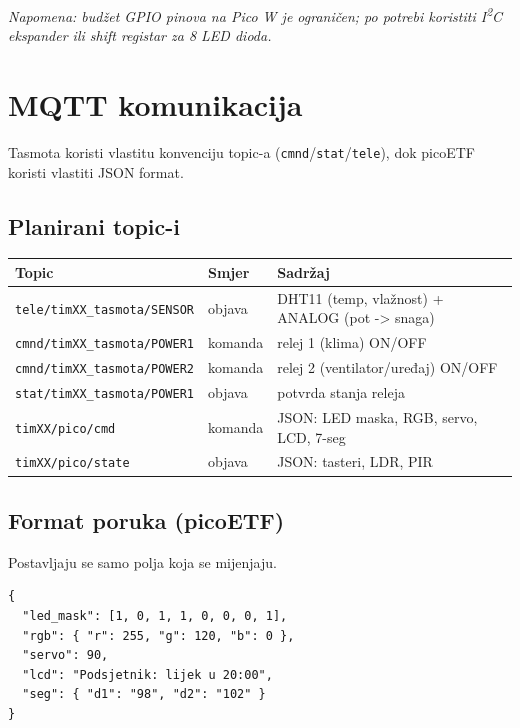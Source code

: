 \documentclass[11pt,a4paper]{article}
\begin{document}
\textit{Napomena: budžet GPIO pinova na Pico W je ograničen; po potrebi koristiti
      I\textsuperscript{2}C ekspander ili shift registar za 8 LED dioda.}

\section{MQTT komunikacija}

Tasmota koristi vlastitu konvenciju topic-a (\texttt{cmnd}/\texttt{stat}/\texttt{tele}),
dok picoETF koristi vlastiti JSON format.

\subsection{Planirani topic-i}
\begin{tabularx}{\textwidth}{@{}L{0.40\textwidth} l X@{}}
      \toprule
      \textbf{Topic}                      & \textbf{Smjer} & \textbf{Sadržaj}                               \\
      \midrule
      \texttt{tele/timXX\_tasmota/SENSOR} & objava         & DHT11 (temp, vlažnost) + ANALOG (pot -> snaga) \\
      \texttt{cmnd/timXX\_tasmota/POWER1} & komanda        & relej 1 (klima) ON/OFF                         \\
      \texttt{cmnd/timXX\_tasmota/POWER2} & komanda        & relej 2 (ventilator/uređaj) ON/OFF             \\
      \texttt{stat/timXX\_tasmota/POWER1} & objava         & potvrda stanja releja                          \\
      \texttt{timXX/pico/cmd}             & komanda        & JSON: LED maska, RGB, servo, LCD, 7-seg        \\
      \texttt{timXX/pico/state}           & objava         & JSON: tasteri, LDR, PIR                        \\
      \bottomrule
\end{tabularx}

\subsection{Format poruka (picoETF)}
Postavljaju se samo polja koja se mijenjaju.

\begin{lstlisting}[style=json,caption={Komanda: sistem -> picoETF (timXX/pico/cmd)},captionpos=b]
{
  "led_mask": [1, 0, 1, 1, 0, 0, 0, 1],
  "rgb": { "r": 255, "g": 120, "b": 0 },
  "servo": 90,
  "lcd": "Podsjetnik: lijek u 20:00",
  "seg": { "d1": "98", "d2": "102" }
}
\end{lstlisting}
\end{document}
